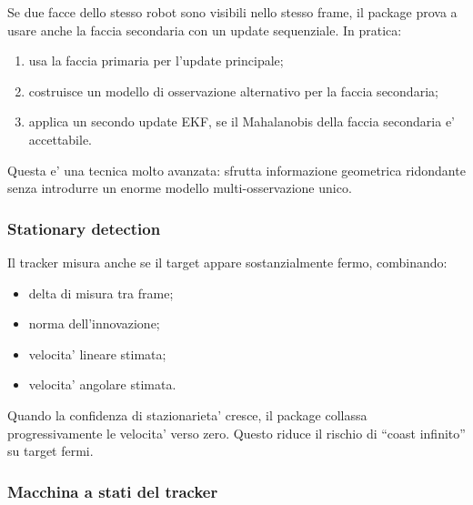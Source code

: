 \documentclass[11pt,a4paper]{article}
\begin{document}
Se due facce dello stesso robot sono visibili nello stesso frame, il package prova a usare anche la faccia secondaria con un update sequenziale. In pratica:
\begin{enumerate}[leftmargin=1.4em]
  \item usa la faccia primaria per l'update principale;
  \item costruisce un modello di osservazione alternativo per la faccia secondaria;
  \item applica un secondo update EKF, se il Mahalanobis della faccia secondaria e' accettabile.
\end{enumerate}

Questa e' una tecnica molto avanzata: sfrutta informazione geometrica ridondante senza introdurre un enorme modello multi-osservazione unico.

\subsubsection{Stationary detection}

Il tracker misura anche se il target appare sostanzialmente fermo, combinando:
\begin{itemize}[leftmargin=1.4em]
  \item delta di misura tra frame;
  \item norma dell'innovazione;
  \item velocita' lineare stimata;
  \item velocita' angolare stimata.
\end{itemize}

Quando la confidenza di stazionarieta' cresce, il package collassa progressivamente le velocita' verso zero. Questo riduce il rischio di ``coast infinito'' su target fermi.

\subsubsection{Macchina a stati del tracker}
\end{document}
